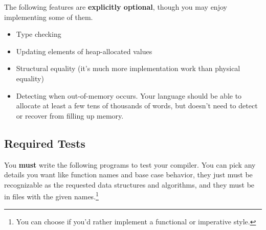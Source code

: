 \documentclass[10pt, oneside]{article}
\begin{document}
The following features are {\bf explicitly optional}, though you may enjoy
implementing some of them.

\begin{itemize}
\item Type checking
\item Updating elements of heap-allocated values
\item Structural equality (it's much more implementation work than physical equality)
\item Detecting when out-of-memory occurs. Your language should be able to
allocate at least a few tens of thousands of words, but doesn't need to
detect or recover from filling up memory.
\end{itemize}

\subsection*{Required Tests}

You {\bf must} write the following programs to test your compiler. You can
pick any details you want like function names and base case behavior, they
just must be recognizable as the requested data structures and algorithms,
and they must be in files with the given names.\footnote{You can choose if
you'd rather implement a functional or imperative style.}
\end{document}
